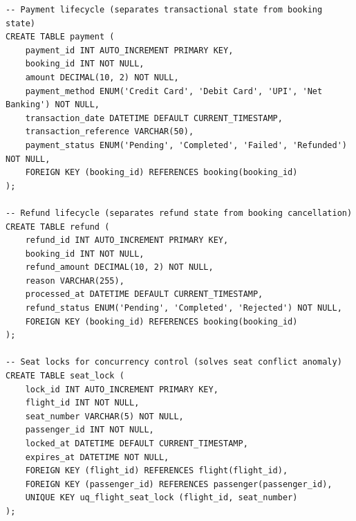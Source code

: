 \documentclass[12pt, a4paper]{article}
\begin{document}
\begin{lstlisting}[style=sqlstyle]
-- Payment lifecycle (separates transactional state from booking state)
CREATE TABLE payment (
    payment_id INT AUTO_INCREMENT PRIMARY KEY,
    booking_id INT NOT NULL,
    amount DECIMAL(10, 2) NOT NULL,
    payment_method ENUM('Credit Card', 'Debit Card', 'UPI', 'Net Banking') NOT NULL,
    transaction_date DATETIME DEFAULT CURRENT_TIMESTAMP,
    transaction_reference VARCHAR(50),
    payment_status ENUM('Pending', 'Completed', 'Failed', 'Refunded') NOT NULL,
    FOREIGN KEY (booking_id) REFERENCES booking(booking_id)
);

-- Refund lifecycle (separates refund state from booking cancellation)
CREATE TABLE refund (
    refund_id INT AUTO_INCREMENT PRIMARY KEY,
    booking_id INT NOT NULL,
    refund_amount DECIMAL(10, 2) NOT NULL,
    reason VARCHAR(255),
    processed_at DATETIME DEFAULT CURRENT_TIMESTAMP,
    refund_status ENUM('Pending', 'Completed', 'Rejected') NOT NULL,
    FOREIGN KEY (booking_id) REFERENCES booking(booking_id)
);

-- Seat locks for concurrency control (solves seat conflict anomaly)
CREATE TABLE seat_lock (
    lock_id INT AUTO_INCREMENT PRIMARY KEY,
    flight_id INT NOT NULL,
    seat_number VARCHAR(5) NOT NULL,
    passenger_id INT NOT NULL,
    locked_at DATETIME DEFAULT CURRENT_TIMESTAMP,
    expires_at DATETIME NOT NULL,
    FOREIGN KEY (flight_id) REFERENCES flight(flight_id),
    FOREIGN KEY (passenger_id) REFERENCES passenger(passenger_id),
    UNIQUE KEY uq_flight_seat_lock (flight_id, seat_number)
);
\end{lstlisting}
\end{document}

